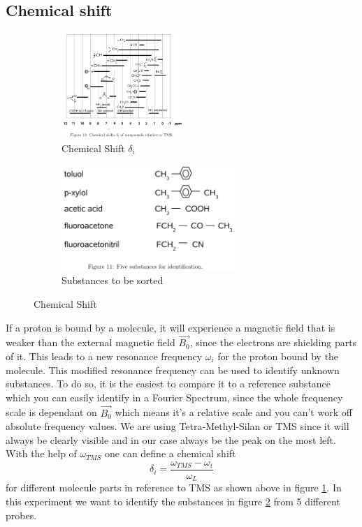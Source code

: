 \subsection{Chemical shift}\label{chemShift}
\begin{figure}[h]
	\begin{subfigure}{0.5\textwidth}
	\centering
	\includegraphics[width=0.7\linewidth ,height=4cm]{images/ChemShift.png}
	\caption{Chemical Shift $\delta_i$}
	\label{shi1}
	\end{subfigure}
	\begin{subfigure}{0.5\textwidth}
	\includegraphics[width=0.9\linewidth ,height=4cm]{images/substances.png}
	\caption{Substances to be sorted}
	\label{shi2}
	\end{subfigure}
	\caption{Chemical Shift}
	\label{shi3}
\end{figure}
If a proton is bound by a molecule, it will experience a magnetic field that is weaker than the external magnetic field $\vec{B_0}$, since the electrons are shielding parts of it. This leads to a new resonance frequency $\omega_i$ for the proton bound by the molecule. This modified resonance frequency can be used to identify unknown substances. To do so, it is the easiest to compare it to a reference substance which you can easily identify in a Fourier Spectrum, since the whole frequency scale is dependant on $\vec{B_0}$ which means it's a relative scale and you can't work off absolute frequency values. We are using Tetra-Methyl-Silan or TMS since it will always be clearly visible and in our case always be the peak on the most left. With the help of $\omega_{TMS}$ one can define a chemical shift
\begin{equation}\label{deltashift}
	\delta_i = \frac{\omega_{TMS}-\omega_{i}}{\omega_{L}}
\end{equation} 
for different molecule parts in reference to TMS as shown above in figure \ref{shi1}. In this experiment we want to identify the substances in figure \ref{shi2} from 5 different probes. \\
